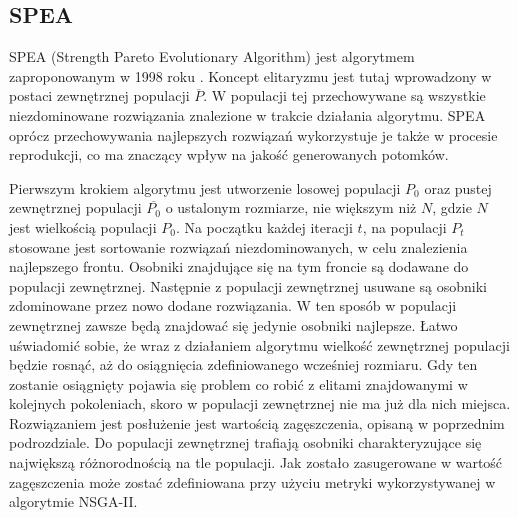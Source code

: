 \documentclass[twoside]{iisthesis}
\begin{document}
\subsection{SPEA}
SPEA (Strength Pareto Evolutionary Algorithm) jest algorytmem zaproponowanym w 1998 roku \cite{spea}. Koncept elitaryzmu jest tutaj wprowadzony w postaci zewnętrznej populacji $\overline{P}$. W populacji tej przechowywane są wszystkie niezdominowane rozwiązania znalezione w trakcie działania algorytmu. SPEA oprócz przechowywania najlepszych rozwiązań wykorzystuje je także w procesie reprodukcji, co ma znaczący wpływ na jakość generowanych potomków.

Pierwszym krokiem algorytmu jest utworzenie losowej populacji $P_{0}$ oraz pustej zewnętrznej populacji $\overline{P_{0}}$ o ustalonym rozmiarze, nie większym niż $N$, gdzie $N$ jest wielkością populacji $P_{0}$. Na początku każdej iteracji $t$, na populacji $P_{t}$ stosowane jest sortowanie rozwiązań niezdominowanych, w celu znalezienia najlepszego frontu. Osobniki znajdujące się na tym froncie są dodawane do populacji zewnętrznej. Następnie z populacji zewnętrznej usuwane są osobniki zdominowane przez nowo dodane rozwiązania. W ten sposób w populacji zewnętrznej zawsze będą znajdować się jedynie osobniki najlepsze. Łatwo uświadomić sobie, że wraz z działaniem algorytmu wielkość zewnętrznej populacji będzie rosnąć, aż do osiągnięcia zdefiniowanego wcześniej rozmiaru. Gdy ten zostanie osiągnięty pojawia się problem co robić z elitami znajdowanymi w kolejnych pokoleniach, skoro w populacji zewnętrznej nie ma już dla nich miejsca. Rozwiązaniem jest posłużenie jest wartością zagęszczenia, opisaną w poprzednim podrozdziale. Do populacji zewnętrznej trafiają osobniki charakteryzujące się największą różnorodnością na tle populacji. Jak zostało zasugerowane w \cite{book} wartość zagęszczenia może zostać zdefiniowana przy użyciu metryki wykorzystywanej w algorytmie NSGA-II.
\end{document}
